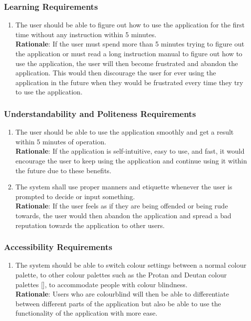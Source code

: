 \subsubsection{Learning Requirements}
\label{ssub:learning_requirements}
\begin{enumerate}[{UH-L}1. ]
	\item The user should be able to figure out how to use the application for the first time without any instruction within 5 minutes.
	\\ \textbf{Rationale}: If the user must spend more than 5 minutes trying to figure out the application or must read a long instruction manual to figure out how to use the application, the user will then become frustrated and abandon the application. This would then discourage the user for ever using the application in the future when they would be frustrated every time they try to use the application.	
\end{enumerate}

\subsubsection{Understandability and Politeness Requirements}
\label{ssub:understandability_and_politeness_requirements}
\begin{enumerate}[{UH-UP}1. ]
	\item The user should be able to use the application smoothly and get a result within 5 minutes of operation.
	\\ \textbf{Rationale}: If the application is self-intuitive, easy to use, and fast, it would encourage the user to keep using the application and continue using it within the future due to these benefits.
	\item The system shall use proper manners and etiquette whenever the user is prompted to decide or input something.
	\\ \textbf{Rationale}: If the user feels as if they are being offended or being rude towards, the user would then abandon the application and spread a bad reputation towards the application to other users.
\end{enumerate}


\subsubsection{Accessibility Requirements}
\label{ssub:accessibility_requirements}
\begin{enumerate}[{UH-A}1. ]
	\item The system should be able to switch colour settings between a normal colour palette, to other colour palettes such as the Protan and Deutan colour palettes [], to accommodate people with colour blindness.
	\\ \textbf{Rationale}: Users who are colourblind will then be able to differentiate between different parts of the application but also be able to use the functionality of the application with more ease.
	
\end{enumerate}


